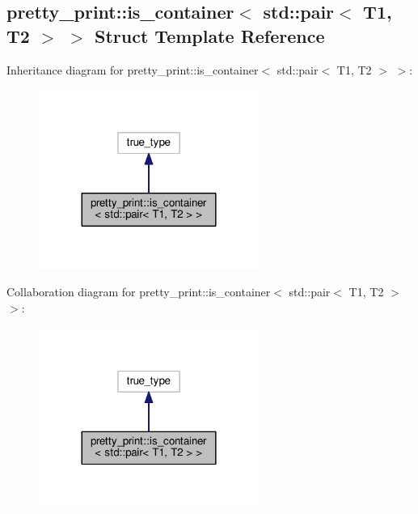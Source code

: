 \hypertarget{structpretty__print_1_1is__container_3_01std_1_1pair_3_01T1_00_01T2_01_4_01_4}{}\subsection{pretty\+\_\+print\+:\+:is\+\_\+container$<$ std\+:\+:pair$<$ T1, T2 $>$ $>$ Struct Template Reference}
\label{structpretty__print_1_1is__container_3_01std_1_1pair_3_01T1_00_01T2_01_4_01_4}


Inheritance diagram for pretty\+\_\+print\+:\+:is\+\_\+container$<$ std\+:\+:pair$<$ T1, T2 $>$ $>$\+:\nopagebreak
\begin{figure}[H]
\begin{center}
\leavevmode
\includegraphics[width=204pt]{structpretty__print_1_1is__container_3_01std_1_1pair_3_01T1_00_01T2_01_4_01_4__inherit__graph}
\end{center}
\end{figure}


Collaboration diagram for pretty\+\_\+print\+:\+:is\+\_\+container$<$ std\+:\+:pair$<$ T1, T2 $>$ $>$\+:\nopagebreak
\begin{figure}[H]
\begin{center}
\leavevmode
\includegraphics[width=204pt]{structpretty__print_1_1is__container_3_01std_1_1pair_3_01T1_00_01T2_01_4_01_4__coll__graph}
\end{center}
\end{figure}


